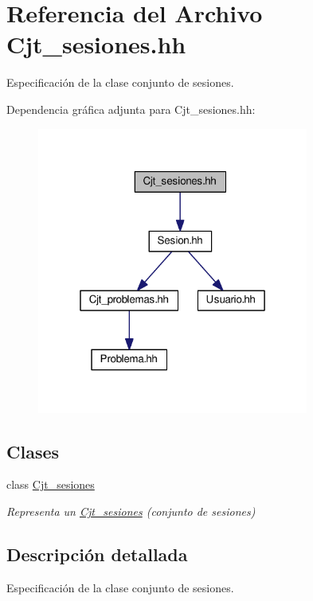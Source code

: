 \hypertarget{_cjt__sesiones_8hh}{}\section{Referencia del Archivo Cjt\+\_\+sesiones.\+hh}
\label{_cjt__sesiones_8hh}


Especificación de la clase conjunto de sesiones.  


Dependencia gráfica adjunta para Cjt\+\_\+sesiones.\+hh\+:
\nopagebreak
\begin{figure}[H]
\begin{center}
\leavevmode
\includegraphics[width=253pt]{_cjt__sesiones_8hh__incl}
\end{center}
\end{figure}
\subsection*{Clases}
\begin{DoxyCompactItemize}
\item 
class \mbox{\hyperlink{class_cjt__sesiones}{Cjt\+\_\+sesiones}}
\begin{DoxyCompactList}\small\item\em Representa un \mbox{\hyperlink{class_cjt__sesiones}{Cjt\+\_\+sesiones}} (conjunto de sesiones) \end{DoxyCompactList}\end{DoxyCompactItemize}


\subsection{Descripción detallada}
Especificación de la clase conjunto de sesiones. 

